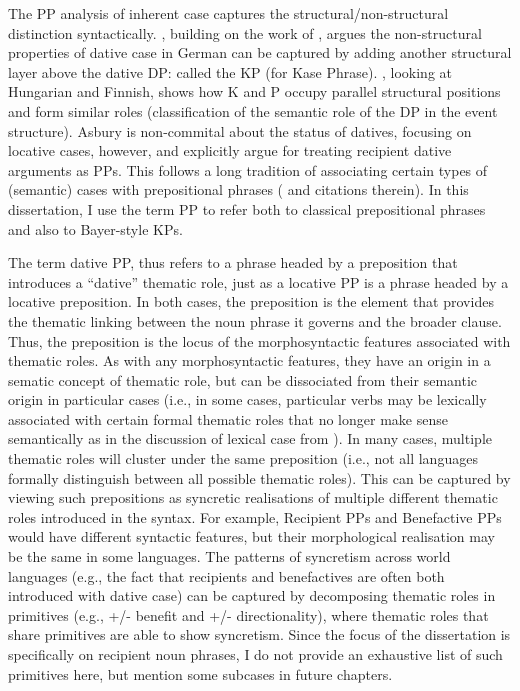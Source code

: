 The PP analysis of inherent case captures the structural/non-structural distinction syntactically. \cite{Bayer.2001}, building on the work of \cite{Bittner.1996}, argues the non-structural properties of dative case in German can be captured by adding another structural layer above the dative DP: called the KP (for Kase Phrase). \cite{Asbury.2005,Asbury.2007}, looking at Hungarian and Finnish, shows how K and P occupy parallel structural positions and form similar roles (classification of the semantic role of the DP in the event structure). Asbury is non-commital about the status of datives, focusing on locative cases, however, \cite{Rezac.2008} and \cite{Caha.2009} explicitly argue for treating recipient dative arguments as PPs. This follows a long tradition of associating certain types of (semantic) cases with prepositional phrases (\citealt{McFadden.2004} and citations therein). In this dissertation, I use the term PP to refer both to classical prepositional phrases and also to Bayer-style KPs.

The term dative PP, thus refers to a phrase headed by a preposition that introduces a ``dative'' thematic role, just as a locative PP is a phrase headed by a locative preposition. In both cases, the preposition is the element that provides the thematic linking between the noun phrase it governs and the broader clause. Thus, the preposition is the locus of the morphosyntactic features associated with thematic roles. As with any morphosyntactic features, they have an origin in a sematic concept of thematic role, but can be dissociated from their semantic origin in particular cases (i.e., in some cases, particular verbs may be lexically associated with certain formal thematic roles that no longer make sense semantically as in the discussion of lexical case from \cite{Woolford.2006}). In many cases, multiple thematic roles will cluster under the same preposition (i.e., not all languages formally distinguish between all possible thematic roles). This can be captured by viewing such prepositions as syncretic realisations of multiple different thematic roles introduced in the syntax. For example, Recipient PPs and Benefactive PPs would have different syntactic features, but their morphological realisation may be the same in some languages. The patterns of syncretism across world languages (e.g., the fact that recipients and benefactives are often both introduced with dative case) can be captured by decomposing thematic roles in primitives (e.g., +/- benefit and +/- directionality), where thematic roles that share primitives are able to show syncretism. Since the focus of the dissertation is specifically on recipient noun phrases, I do not provide an exhaustive list of such primitives here, but mention some subcases in future chapters.


